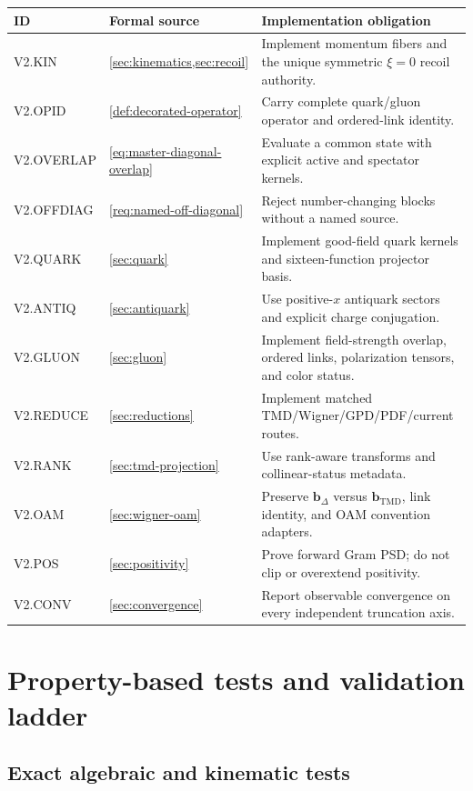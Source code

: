 \documentclass[11pt]{article}
\newcommand{\bD}{\bm{b}_{\Delta}}
\newcommand{\bM}{\bm{b}_{\mathrm{TMD}}}
\begin{document}
\begin{longtable}{L{0.16\textwidth}L{0.34\textwidth}L{0.40\textwidth}}
\toprule
ID & Formal source & Implementation obligation\\
\midrule
\endhead
V2.KIN & \cref{sec:kinematics,sec:recoil} & Implement momentum fibers and the unique symmetric \(\xi=0\) recoil authority.\\
V2.OPID & \cref{def:decorated-operator} & Carry complete quark/gluon operator and ordered-link identity.\\
V2.OVERLAP & \cref{eq:master-diagonal-overlap} & Evaluate a common state with explicit active and spectator kernels.\\
V2.OFFDIAG & \cref{req:named-off-diagonal} & Reject number-changing blocks without a named source.\\
V2.QUARK & \cref{sec:quark} & Implement good-field quark kernels and sixteen-function projector basis.\\
V2.ANTIQ & \cref{sec:antiquark} & Use positive-\(x\) antiquark sectors and explicit charge conjugation.\\
V2.GLUON & \cref{sec:gluon} & Implement field-strength overlap, ordered links, polarization tensors, and color status.\\
V2.REDUCE & \cref{sec:reductions} & Implement matched TMD/Wigner/GPD/PDF/current routes.\\
V2.RANK & \cref{sec:tmd-projection} & Use rank-aware transforms and collinear-status metadata.\\
V2.OAM & \cref{sec:wigner-oam} & Preserve \(\bD\) versus \(\bM\), link identity, and OAM convention adapters.\\
V2.POS & \cref{sec:positivity} & Prove forward Gram PSD; do not clip or overextend positivity.\\
V2.CONV & \cref{sec:convergence} & Report observable convergence on every independent truncation axis.\\
\bottomrule
\end{longtable}

\section{Property-based tests and validation ladder}
\label{sec:tests}

\subsection{Exact algebraic and kinematic tests}
\end{document}
